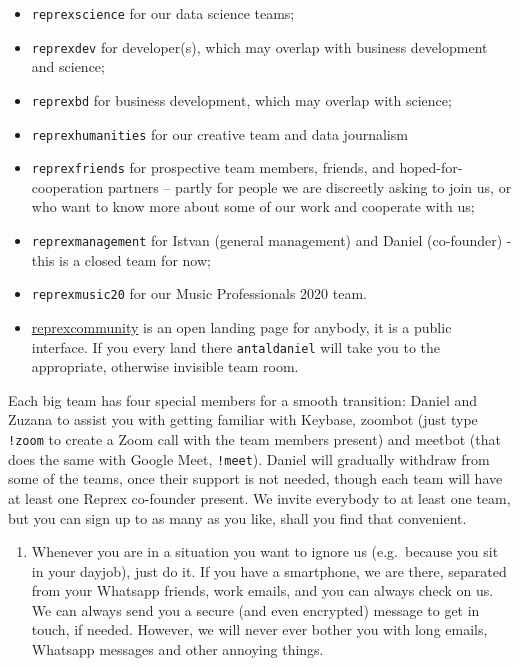 \documentclass[
  fontsize=13pt,
  english,
  a4paper,
  openany, a4paper, oneside]{book}
\providecommand{\tightlist}{%
  \setlength{\itemsep}{0pt}\setlength{\parskip}{0pt}}
\begin{document}
\begin{itemize}
\tightlist
\item
  \texttt{reprexscience} for our data science teams;
\item
  \texttt{reprexdev} for developer(s), which may overlap with business development and science;
\item
  \texttt{reprexbd} for business development, which may overlap with science;
\item
  \texttt{reprexhumanities} for our creative team and data journalism
\item
  \texttt{reprexfriends} for prospective team members, friends, and hoped-for-cooperation partners -- partly for people we are discreetly asking to join us, or who want to know more about some of our work and cooperate with us;
\item
  \texttt{reprexmanagement} for Istvan (general management) and Daniel (co-founder) - this is a closed team for now;
\item
  \texttt{reprexmusic20} for our Music Professionals 2020 team.
\item
  \href{https://keybase.io/team/reprexcommunity}{reprexcommunity} is an open landing page for anybody, it is a public interface. If you every land there \texttt{antaldaniel} will take you to the appropriate, otherwise invisible team room.
\end{itemize}

Each big team has four special members for a smooth transition: Daniel and Zuzana to assist you with getting familiar with Keybase, zoombot (just type \texttt{!zoom} to create a Zoom call with the team members present) and meetbot (that does the same with Google Meet, \texttt{!meet}). Daniel will gradually withdraw from some of the teams, once their support is not needed, though each team will have at least one Reprex co-founder present. We invite everybody to at least one team, but you can sign up to as many as you like, shall you find that convenient.

\begin{enumerate}
\def\labelenumi{\arabic{enumi}.}
\setcounter{enumi}{8}
\tightlist
\item
  Whenever you are in a situation you want to ignore us (e.g.~because you sit in your dayjob), just do it. If you have a smartphone, we are there, separated from your Whatsapp friends, work emails, and you can always check on us. We can always send you a secure (and even encrypted) message to get in touch, if needed. However, we will never ever bother you with long emails, Whatsapp messages and other annoying things.
\end{enumerate}
\end{document}
